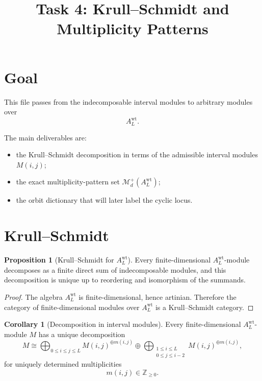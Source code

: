 \documentclass{article}
\title{Task 4: Krull--Schmidt and Multiplicity Patterns}
\date{}
\theoremstyle{definition}
\newtheorem{proposition}[theorem]{Proposition}
\newtheorem{corollary}[theorem]{Corollary}
\begin{document}
\maketitle

\section{Goal}

This file passes from the indecomposable interval modules to arbitrary modules
over
\[
A_L^{\mathrm{wt}}.
\]

The main deliverables are:

\begin{itemize}
\item the Krull--Schmidt decomposition in terms of the admissible interval
  modules $M(i,j)$;
\item the exact multiplicity-pattern set
  $\mathcal M_d^+(A_L^{\mathrm{wt}})$;
\item the orbit dictionary that will later label the cyclic locus.
\end{itemize}

\section{Krull--Schmidt}

\begin{proposition}[Krull--Schmidt for $A_L^{\mathrm{wt}}$]
Every finite-dimensional $A_L^{\mathrm{wt}}$-module decomposes as a finite
direct sum of indecomposable modules, and this decomposition is unique up to
reordering and isomorphism of the summands.
\end{proposition}

\begin{proof}
The algebra $A_L^{\mathrm{wt}}$ is finite-dimensional, hence artinian.
Therefore the category of finite-dimensional modules over
$A_L^{\mathrm{wt}}$ is a Krull--Schmidt category.
\end{proof}

\begin{corollary}[Decomposition in interval modules]
Every finite-dimensional $A_L^{\mathrm{wt}}$-module $M$ has a unique
decomposition
\[
M
\cong
\bigoplus_{0\le i\le j\le L} M(i,j)^{\oplus m(i,j)}
\oplus
\bigoplus_{\substack{1\le i\le L\\0\le j\le i-2}}
M(i,j)^{\oplus m(i,j)},
\]
for uniquely determined multiplicities
\[
m(i,j)\in \mathbb Z_{\ge 0}.
\]
\end{corollary}
\end{document}
